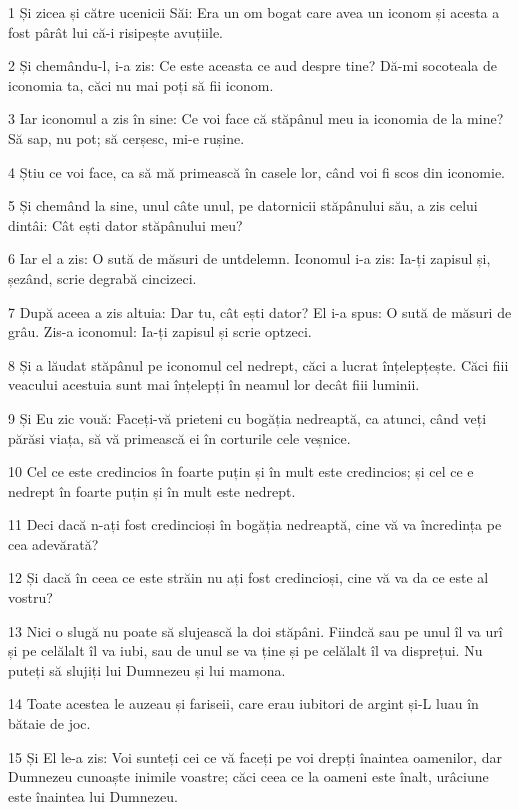 \par 1 Și zicea și către ucenicii Săi: Era un om bogat care avea un iconom și acesta a fost pârât lui că-i risipește avuțiile.
\par 2 Și chemându-l, i-a zis: Ce este aceasta ce aud despre tine? Dă-mi socoteala de iconomia ta, căci nu mai poți să fii iconom.
\par 3 Iar iconomul a zis în sine: Ce voi face că stăpânul meu ia iconomia de la mine? Să sap, nu pot; să cerșesc, mi-e rușine.
\par 4 Știu ce voi face, ca să mă primească în casele lor, când voi fi scos din iconomie.
\par 5 Și chemând la sine, unul câte unul, pe datornicii stăpânului său, a zis celui dintâi: Cât ești dator stăpânului meu?
\par 6 Iar el a zis: O sută de măsuri de untdelemn. Iconomul i-a zis: Ia-ți zapisul și, șezând, scrie degrabă cincizeci.
\par 7 După aceea a zis altuia: Dar tu, cât ești dator? El i-a spus: O sută de măsuri de grâu. Zis-a iconomul: Ia-ți zapisul și scrie optzeci.
\par 8 Și a lăudat stăpânul pe iconomul cel nedrept, căci a lucrat înțelepțește. Căci fiii veacului acestuia sunt mai înțelepți în neamul lor decât fiii luminii.
\par 9 Și Eu zic vouă: Faceți-vă prieteni cu bogăția nedreaptă, ca atunci, când veți părăsi viața, să vă primească ei în corturile cele veșnice.
\par 10 Cel ce este credincios în foarte puțin și în mult este credincios; și cel ce e nedrept în foarte puțin și în mult este nedrept.
\par 11 Deci dacă n-ați fost credincioși în bogăția nedreaptă, cine vă va încredința pe cea adevărată?
\par 12 Și dacă în ceea ce este străin nu ați fost credincioși, cine vă va da ce este al vostru?
\par 13 Nici o slugă nu poate să slujească la doi stăpâni. Fiindcă sau pe unul îl va urî și pe celălalt îl va iubi, sau de unul se va ține și pe celălalt îl va disprețui. Nu puteți să slujiți lui Dumnezeu și lui mamona.
\par 14 Toate acestea le auzeau și fariseii, care erau iubitori de argint și-L luau în bătaie de joc.
\par 15 Și El le-a zis: Voi sunteți cei ce vă faceți pe voi drepți înaintea oamenilor, dar Dumnezeu cunoaște inimile voastre; căci ceea ce la oameni este înalt, urâciune este înaintea lui Dumnezeu.
